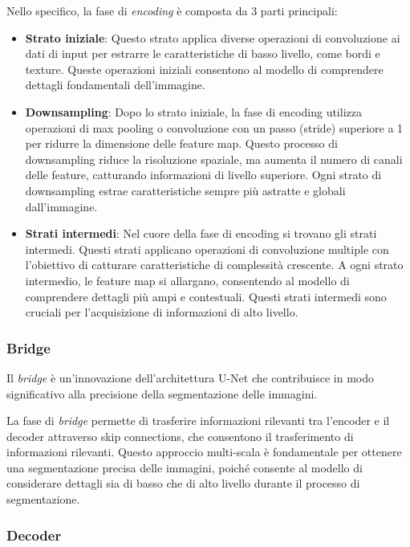Nello specifico, la fase di \textit{encoding} è composta da 3 parti principali:
\begin{itemize}
  \item \textbf{Strato iniziale}: Questo strato applica diverse operazioni di convoluzione ai dati di input per estrarre le caratteristiche di basso livello, come bordi e texture. Queste operazioni iniziali consentono al modello di comprendere dettagli fondamentali dell'immagine.
  \item \textbf{Downsampling}: Dopo lo strato iniziale, la fase di encoding utilizza operazioni di max pooling o convoluzione con un passo (stride) superiore a 1 per ridurre la dimensione delle feature map. Questo processo di downsampling riduce la risoluzione spaziale, ma aumenta il numero di canali delle feature, catturando informazioni di livello superiore. Ogni strato di downsampling estrae caratteristiche sempre più astratte e globali dall'immagine.
  \item \textbf{Strati intermedi}: Nel cuore della fase di encoding si trovano gli strati intermedi. Questi strati applicano operazioni di convoluzione multiple con l'obiettivo di catturare caratteristiche di complessità crescente. A ogni strato intermedio, le feature map si allargano, consentendo al modello di comprendere dettagli più ampi e contestuali. Questi strati intermedi sono cruciali per l'acquisizione di informazioni di alto livello.
\end{itemize}



\subsubsection{Bridge} %
\label{sec:Bridge}
Il \textit{bridge} è un'innovazione dell'architettura U-Net che contribuisce in modo significativo alla precisione della segmentazione delle immagini.

La fase di \textit{bridge} permette di trasferire informazioni rilevanti tra l'encoder e il decoder attraverso skip connections, che consentono il trasferimento di informazioni rilevanti. Questo approccio multi-scala è fondamentale per ottenere una segmentazione precisa delle immagini, poiché consente al modello di considerare dettagli sia di basso che di alto livello durante il processo di segmentazione.




\subsubsection{Decoder} %
\label{sec:Decoder}

